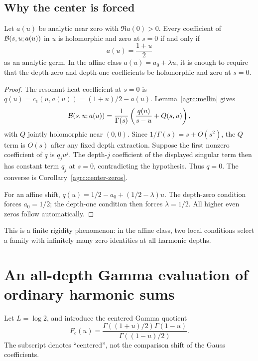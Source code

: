 \subsection{Why the center is forced}

\begin{theorem}
\label{agrc:unique-center}
Let $a(u)$ be analytic near zero with $\Re a(0)>0$.
Every coefficient of $\mathcal B(s,u;a(u))$ in $u$ is holomorphic and zero at
$s=0$ if and only if
\begin{equation}\label{agrc:unique-shift}
 a(u)=\frac{1+u}{2}
\end{equation}
as an analytic germ. In the affine class $a(u)=a_0+\lambda u$, it is
enough to require that the depth-zero and depth-one coefficients be
holomorphic and zero at $s=0$.
\end{theorem}
\begin{proof}
The resonant heat coefficient at $s=0$ is
$q(u)=c_1(u,a(u))=(1+u)/2-a(u)$. Lemma~\ref{agrc:mellin} gives
\[
 \mathcal B(s,u;a(u))=\frac1{\Gamma(s)}\left(\frac{q(u)}{s-u}+Q(s,u)\right),
\]
with $Q$ jointly holomorphic near $(0,0)$. Since
$1/\Gamma(s)=s+O(s^2)$, the $Q$ term is $O(s)$ after any fixed depth
extraction. Suppose the first nonzero coefficient of $q$ is $q_j u^j$.
The depth-$j$ coefficient of the displayed singular term then has
constant term $q_j$ at $s=0$, contradicting the hypothesis. Thus $q=0$.
The converse is Corollary~\ref{agrc:center-zeros}.

For an affine shift,
$q(u)=1/2-a_0+(1/2-\lambda)u$. The depth-zero condition forces
$a_0=1/2$; the depth-one condition then forces $\lambda=1/2$.
All higher even zeros follow automatically.
\end{proof}

This is a finite rigidity phenomenon: in the affine class, two local
conditions select a family with infinitely many zero identities at
all harmonic depths.

\section{An all-depth Gamma evaluation of ordinary harmonic sums}
\label{agrc:ordinary-sums}

Let $L=\log2$, and introduce the centered Gamma quotient
\begin{equation}\label{agrc:Fc}
 F_c(u)=\frac{\Gamma((1+u)/2)\Gamma(1-u)}{\Gamma((1-u)/2)}.
\end{equation}
The subscript denotes ``centered'', not the comparison shift of the
Gauss coefficients.

